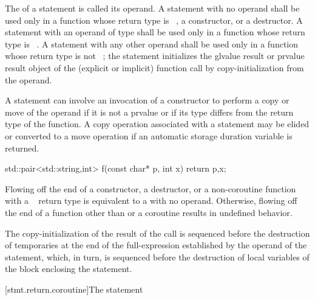 \pnum
The 
of a  statement is called its operand. A  statement with
no operand shall be used only in a function whose return type is
\cv{}~, a constructor, or a
destructor.
%
%
A  statement with an operand of type  shall be used only
in a function whose return type is \cv{}~.
A  statement with any other operand shall be used only
in a function whose return type is not \cv{}~;
%
the  statement initializes the
glvalue result or prvalue result object of the (explicit or implicit) function call
by copy-initialization from the operand.
\begin{note}
A  statement can involve
an invocation of a constructor to perform a copy or move of the operand
if it is not a prvalue or if its type differs from the return type of the function.
A copy operation associated with a  statement may be elided or
converted to a move operation if an automatic storage duration variable is returned.
\end{note}
\begin{example}
\begin{codeblock}
std::pair<std::string,int> f(const char* p, int x) {
  return {p,x};
}
\end{codeblock}
\end{example}
Flowing off the end of
a constructor,
a destructor, or
a non-coroutine function with a \cv{}~ return type is
equivalent to a  with no operand.
Otherwise, flowing off the end of a function
other than  or a coroutine
results in undefined behavior.

\pnum
The copy-initialization of the result of the call is sequenced before the
destruction of temporaries at the end of the full-expression established
by the operand of the  statement, which, in turn, is sequenced
before the destruction of local variables of the block
enclosing the  statement.

[stmt.return.coroutine]{The  statement}%
%
%

\begin{bnf}
\br
      \terminal{;}
\end{bnf}

